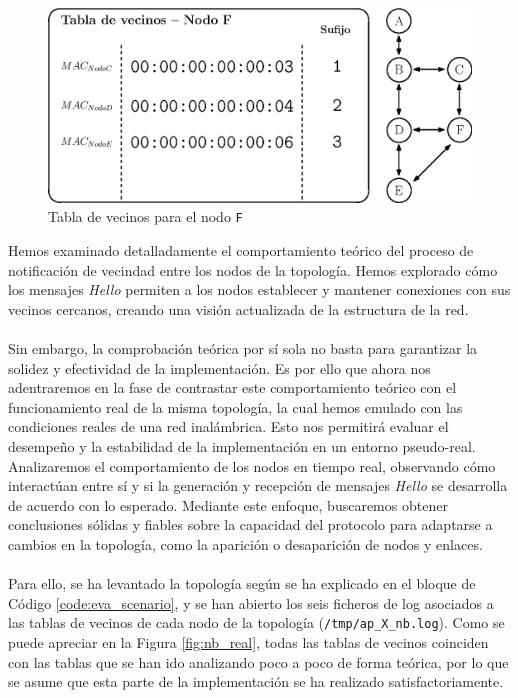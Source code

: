 \begin{figure}[ht!]
    \centering
    \includegraphics[width=\textwidth]{archivos/img/dev/topo_hello_nodoF_nb.eps}
    \caption{Tabla de vecinos para el nodo \texttt{F}}
    \label{fig:topo_hello_nodoF_nb}
\end{figure}


Hemos examinado detalladamente el comportamiento teórico del proceso de notificación de vecindad entre los nodos de la topología. Hemos explorado cómo los mensajes \textit{Hello} permiten a los nodos establecer y mantener conexiones con sus vecinos cercanos, creando una visión actualizada de la estructura de la red.\\
\\
Sin embargo, la comprobación teórica por sí sola no basta para garantizar la solidez y efectividad de la implementación. Es por ello que ahora nos adentraremos en la fase de contrastar este comportamiento teórico con el funcionamiento real de la misma topología, la cual hemos emulado con las condiciones reales de una red inalámbrica. Esto nos permitirá evaluar el desempeño y la estabilidad de la implementación en un entorno pseudo-real. Analizaremos el comportamiento de los nodos en tiempo real, observando cómo interactúan entre sí y si la generación y recepción de mensajes \textit{Hello} se desarrolla de acuerdo con lo esperado. Mediante este enfoque, buscaremos obtener conclusiones sólidas y fiables sobre la capacidad del protocolo para adaptarse a cambios en la topología, como la aparición o desaparición de nodos y enlaces.\\
\\
Para ello, se ha levantado la topología según se ha explicado en el bloque de Código \ref{code:eva_scenario}, y se han abierto los seis ficheros de log asociados a las tablas de vecinos de cada nodo de la topología (\texttt{/tmp/ap\_X\_nb.log}). Como se puede apreciar en la Figura \ref{fig:nb_real}, todas las tablas de vecinos coinciden con las tablas que se han ido analizando poco a poco de forma teórica, por lo que se asume que esta parte de la implementación se ha realizado satisfactoriamente.

